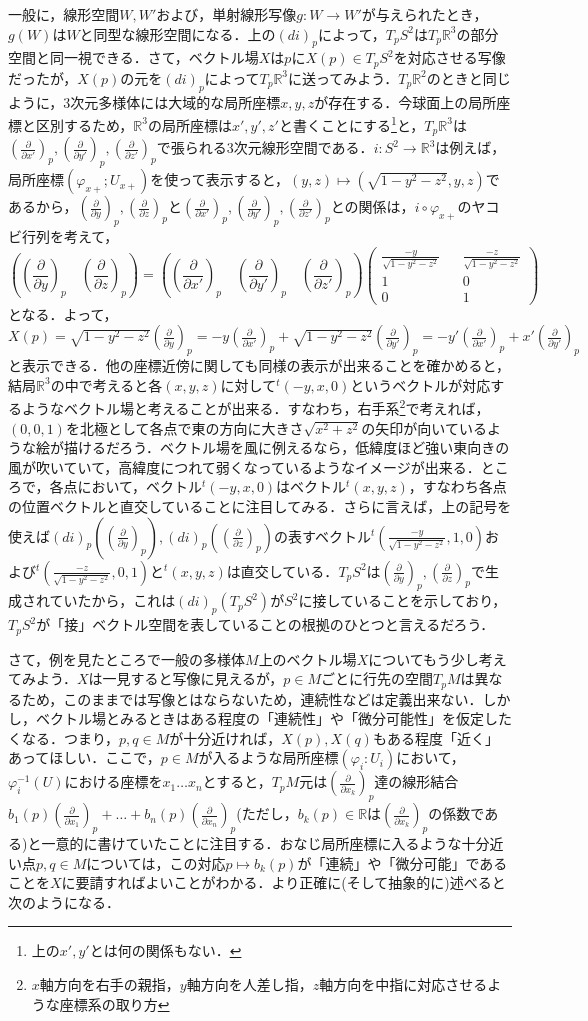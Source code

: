 \documentclass{jsarticle}
\def\vecb{\begin{pmatrix}}
\def\vece{\end{pmatrix}}
\def\realnum{{\mathbb R}}
\def\dfrac{\displaystyle\frac}
\def\tenchi{{}^t\!}
\def\delyp{\left(\dfrac{\partial}{\partial y}\right)_p}
\def\delzp{\left(\dfrac{\partial}{\partial z}\right)_p}
\def\delxdp{\left(\dfrac{\partial}{\partial x'}\right)_p}
\def\delydp{\left(\dfrac{\partial}{\partial y'}\right)_p}
\def\delzdp{\left(\dfrac{\partial}{\partial z'}\right)_p}
\def\delxop{\left(\dfrac{\partial}{\partial x_1}\right)_p}
\def\delxkp{\left(\dfrac{\partial}{\partial x_k}\right)_p}
\def\delxnp{\left(\dfrac{\partial}{\partial x_n}\right)_p}
\begin{document}
一般に，線形空間$W,W'$および，単射線形写像$g:W\rightarrow W'$が与えられたとき，$g(W)$は$W$と同型な線形空間になる．上の$(di)_p$によって，$T_pS^2$は$T_p\realnum^3$の部分空間と同一視できる．さて，ベクトル場$X$は$p$に$X(p)\in T_pS^2$を対応させる写像だったが，$X(p)$の元を$(di)_p$によって$T_p\realnum^3$に送ってみよう．$T_p\realnum^2$のときと同じように，3次元多様体には大域的な局所座標$x,y,z$が存在する．今球面上の局所座標と区別するため，$\realnum^3$の局所座標は$x',y',z'$と書くことにする\footnote{上の$x',y'$とは何の関係もない．}と，$T_p\realnum^3$は$\delxdp,\delydp,\delzdp$で張られる3次元線形空間である．$i:S^2\rightarrow\realnum^3$は例えば，局所座標$(\varphi_{x+};U_{x+})$を使って表示すると，$(y,z)\mapsto(\sqrt{1-y^2-z^2},y,z)$であるから，$\delyp,\delzp$と$\delxdp,\delydp,\delzdp$との関係は，$i\circ\varphi_{x+}$のヤコビ行列を考えて，
$$
\left(\delyp\quad\delzp\right)=\left(\delxdp\quad\delydp\quad\delzdp\right)
\vecb
\frac{-y}{\sqrt{1-y^2-z^2}} && \frac{-z}{\sqrt{1-y^2-z^2}} \\
1 && 0 \\
0 && 1
\vece
$$
となる．よって，$X(p)=\sqrt{1-y^2-z^2}\delyp=-y\delxdp+\sqrt{1-y^2-z^2}\delydp=-y'\delxdp+x'\delydp$と表示できる．他の座標近傍に関しても同様の表示が出来ることを確かめると，結局$\realnum^3$の中で考えると各$(x,y,z)$に対して$\tenchi(-y,x,0)$というベクトルが対応するようなベクトル場と考えることが出来る．すなわち，右手系\footnote{$x$軸方向を右手の親指，$y$軸方向を人差し指，$z$軸方向を中指に対応させるような座標系の取り方}で考えれば，$(0,0,1)$を北極として各点で東の方向に大きさ$\sqrt{x^2+z^2}$の矢印が向いているような絵が描けるだろう．ベクトル場を風に例えるなら，低緯度ほど強い東向きの風が吹いていて，高緯度につれて弱くなっているようなイメージが出来る．ところで，各点において，ベクトル$\tenchi(-y,x,0)$はベクトル$\tenchi(x,y,z)$，すなわち各点の位置ベクトルと直交していることに注目してみる．さらに言えば，上の記号を使えば$(di)_p(\delyp),(di)_p(\delzp)$の表すベクトル$\tenchi(\frac{-y}{\sqrt{1-y^2-z^2}},1,0)$および$\tenchi(\frac{-z}{\sqrt{1-y^2-z^2}},0,1)$と$\tenchi(x,y,z)$は直交している．$T_pS^2$は$\delyp,\delzp$で生成されていたから，これは$(di)_p(T_pS^2)$が$S^2$に接していることを示しており，$T_pS^2$が「接」ベクトル空間を表していることの根拠のひとつと言えるだろう．


さて，例を見たところで一般の多様体$M$上のベクトル場$X$についてもう少し考えてみよう．$X$は一見すると写像に見えるが，$p\in M$ごとに行先の空間$T_pM$は異なるため，このままでは写像とはならないため，連続性などは定義出来ない．しかし，ベクトル場とみるときはある程度の「連続性」や「微分可能性」を仮定したくなる．つまり，$p,q\in M$が十分近ければ，$X(p),X(q)$もある程度「近く」あってほしい．ここで，$p\in M$が入るような局所座標$(\varphi_i:U_i)$において，$\varphi_i^{-1}(U)$における座標を$x_1\dots x_n$とすると，$T_pM$元は$\delxkp$達の線形結合$b_1(p)\delxop+\dots+b_n(p)\delxnp$(ただし，$b_k(p)\in \realnum$は$\delxkp$の係数である)と一意的に書けていたことに注目する．おなじ局所座標に入るような十分近い点$p,q\in M$については，この対応$p\mapsto b_k(p)$が「連続」や「微分可能」であることを$X$に要請すればよいことがわかる．より正確に(そして抽象的に)述べると次のようになる．
\end{document}
